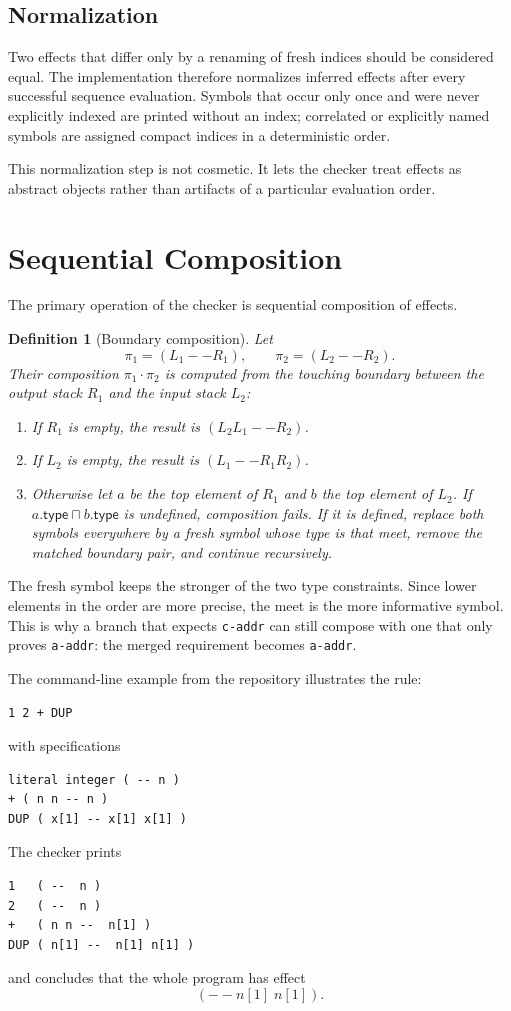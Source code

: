 \documentclass[11pt]{article}
\newtheorem{definition}{Definition}
\newcommand{\glb}{\mathbin{\sqcap}}
\newcommand{\compose}{\mathbin{\cdot}}
\begin{document}
\subsection{Normalization}
Two effects that differ only by a renaming of fresh indices should be considered equal. The implementation therefore normalizes inferred effects after every successful sequence evaluation. Symbols that occur only once and were never explicitly indexed are printed without an index; correlated or explicitly named symbols are assigned compact indices in a deterministic order.

This normalization step is not cosmetic. It lets the checker treat effects as abstract objects rather than artifacts of a particular evaluation order.

\section{Sequential Composition}
The primary operation of the checker is sequential composition of effects.

\begin{definition}[Boundary composition]
Let
\[
\pi_1=(L_1 -- R_1), \qquad \pi_2=(L_2 -- R_2).
\]
Their composition $\pi_1 \compose \pi_2$ is computed from the touching boundary between the output stack $R_1$ and the input stack $L_2$:
\begin{enumerate}
\item If $R_1$ is empty, the result is $(L_2L_1 -- R_2)$.
\item If $L_2$ is empty, the result is $(L_1 -- R_1R_2)$.
\item Otherwise let $a$ be the top element of $R_1$ and $b$ the top element of $L_2$.
  If $a.\mathsf{type} \glb b.\mathsf{type}$ is undefined, composition fails.
  If it is defined, replace both symbols everywhere by a fresh symbol whose type is that meet, remove the matched boundary pair, and continue recursively.
\end{enumerate}
\end{definition}

The fresh symbol keeps the stronger of the two type constraints. Since lower elements in the order are more precise, the meet is the more informative symbol. This is why a branch that expects \texttt{c-addr} can still compose with one that only proves \texttt{a-addr}: the merged requirement becomes \texttt{a-addr}.

The command-line example from the repository illustrates the rule:
\begin{lstlisting}
1 2 + DUP
\end{lstlisting}
with specifications
\begin{lstlisting}
literal integer ( -- n )
+ ( n n -- n )
DUP ( x[1] -- x[1] x[1] )
\end{lstlisting}
The checker prints
\begin{lstlisting}
1   ( --  n )
2   ( --  n )
+   ( n n --  n[1] )
DUP ( n[1] --  n[1] n[1] )
\end{lstlisting}
and concludes that the whole program has effect
\[
( -- n[1]\;n[1]).
\]
\end{document}
